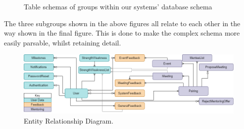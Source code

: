 \documentclass[10pt]{article}
\begin{document}
\begin{figure}[H]
    \centering
    \qquad
    \newline
    \caption{Table schemas of groups within our systems' database schema}
    \label{fig:db_entity_relationship}
\end{figure}

The three subgroups shown in the above figures all relate to each other in the
way shown in the final figure. This is done to make the complex schema more
easily parsable, whilst retaining detail.

\begin{figure}[H]
    \centering
    \includegraphics[width=1\textwidth]{ER}
    \caption{Entity Relationship Diagram.}
    \label{fig:Entity Diagram}
\end{figure}
\end{document}
